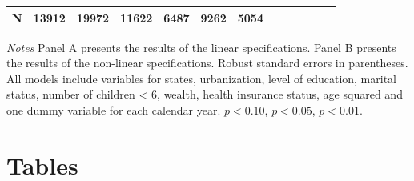 \documentclass[12pt,english]{article}
\begin{document}
\begin{table}[!ht]
\begin{center}
\begin{adjustbox}{max width=.9\linewidth}
\begin{threeparttable}
{\begin{tabular}{l*{6}{S S}}
						\midrule
						N         &    13912         &    19972         &    11622         &     6487         &     9262         &     5054         \\
						\bottomrule
					\end{tabular}
					\begin{tablenotes}
						\item \footnotesize \textit{Notes} Panel A presents the results of the linear specifications. Panel B presents the results of the non-linear specifications. Robust standard errors in parentheses. All models include variables for  states, urbanization, level of education, marital status, number of children < 6, wealth, health insurance status, age squared and one dummy variable for each calendar year. \sym{*} \(p<0.10\), \sym{**} \(p<0.05\), \sym{***} \(p<0.01\).
					\end{tablenotes}
				}
			\end{threeparttable}
		\end{adjustbox}
	\end{center}
\end{table}
\clearpage

\setcounter{table}{0} 
\setcounter{page}{1}
\nolinenumbers
\renewcommand{\thetable}{\arabic{table}}

\section*{Tables}
\end{document}
